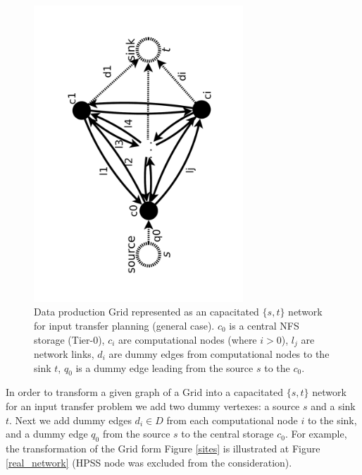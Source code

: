 \documentclass[english]{ddny}
\begin{document}
\begin{figure}[h]
	\begin{center}
		\includegraphics [trim= 30mm 20mm 30mm 30mm , clip, angle =-90, width=0.7\textwidth]{pic/network_general.pdf}
	\end{center}
	\caption{Data production Grid represented as an capacitated $\{s,t\}$ network for input transfer planning (general case). $c_{0}$ is a central NFS storage (Tier-0), $c_{i}$ are computational nodes (where $i>0$), $l_{j}$ are network links, $d_{i}$ are dummy edges from computational nodes to the sink $t$, $q_{0}$ is a dummy edge leading from the source $s$ to the $c_{0}$. }
	\label{network_general}
\end{figure} 

In order to transform a given graph of a Grid into a capacitated $\{s,t\}$
network for an input transfer problem we add two dummy vertexes: a source $s$
and a sink $t$. Next we add  dummy edges $d_{i} \in D$ from each computational
node $i$ to the sink, and a dummy edge $q_{0}$ from the source $s$ to the
central storage $c_{0}$.
For example, the transformation of the Grid form Figure \ref{sites} is illustrated at Figure \ref{real_network} (HPSS node was excluded from the consideration).
\end{document}
